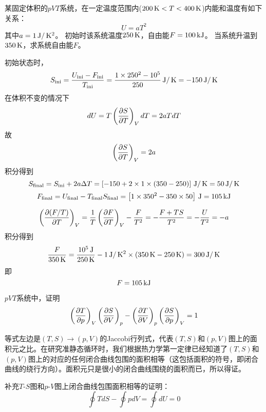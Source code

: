 \documentclass[CJK]{beamer}
\begin{document}
\begin{frame}
  \chtitle{\proid (\sthree)}
  \bch
某固定体积的$pVT$系统，在一定温度范围内($200\,\mathrm{K} < T< 400 \,\mathrm{K}$)内能和温度有如下关系：
  $$U =  aT^2 $$
  其中$a=1 \,\mathrm{J}/\,\mathrm{K}^2$。
  初始时该系统温度$250\,\mathrm{K}$，自由能$F = 100 \,\mathrm{kJ}$。
  当系统升温到$350\,\mathrm{K}$，求系统自由能$F$。
  \ech
\end{frame}

\begin{frame}
  \bch
  初始状态时，
  $$ S_{\rm ini} = \frac{U_{\rm ini}-F_{\rm ini}}{T_{\rm ini}} = \frac{1\times 250^2 - 10^5}{250} \,\mathrm{J}/\,\mathrm{K} = -150\,\mathrm{J}/\,\mathrm{K}$$
  在体积不变的情况下
  $$ dU = T\left(\frac{\partial S}{\partial T}\right)_{V} dT  =  2aTdT$$
  故
  $$ \left(\frac{\partial S}{\partial T}\right)_{V} = 2a $$
  积分得到
  $$ S_{\rm final}  = S_{\rm ini} + 2a\Delta T =  \left[-150 + 2\times 1\times (350-250) \right] \,\mathrm{J}/\,\mathrm{K} = 50 \,\mathrm{J}/\,\mathrm{K} $$
  $$ F_{\rm final} = U_{\rm final}-T_{\rm final}S_{\rm final} = \left[1\times 350^2 - 350\times 50\right] \,\mathrm{J} = 105\,\mathrm{kJ}$$
  
  \ech
\end{frame}

\begin{frame}
  \bch
  $$\left(\frac{\partial (F/T)}{\partial T}\right)_{V} = \frac{1}{T}\left(\frac{\partial F}{\partial T}\right)_{V} - \frac{F}{T^2} = -\frac{F+TS}{T^2} = -\frac{U}{T^2} = -a $$
  积分得到
  $$\frac{F}{350\,\mathrm{K}} = \frac{10^5\,\mathrm{J}}{250\,\mathrm{K}} - 1\,\mathrm{J}/\,\mathrm{K}^2\times(350\,\mathrm{K} - 250\,\mathrm{K}) = 300 \,\mathrm{J}/\,\mathrm{K}$$
  即
  $$F = 105 \,\mathrm{kJ}$$

  \ech
\end{frame}


\begin{frame}
  \chtitle{\proid (\stwo)}
  \bch
  $pVT$系统中，证明
  $$ \left(\frac{\partial T}{\partial p}\right)_{V} \left(\frac{\partial S}{\partial V}\right)_{p} - \left(\frac{\partial T}{\partial V}\right)_{p} \left(\frac{\partial S}{\partial p}\right)_{V} = 1 $$
  \ech
\end{frame}

\begin{frame}
  \bch
  等式左边是$(T,S)\rightarrow (p, V)$的Jaccobi行列式，代表$(T,S)$和$(p,V)$图上的面积元之比。在研究准静态循环时，我们根据热力学第一定律已经知道了$(T,S)$和$(p,V)$图上的对应的任何闭合曲线包围的面积相等（这包括面积的符号，即闭合曲线的绕行方向）。面积元只是很小的闭合曲线围绕的面积而已，所以得证。

  \skipline

  补充$T$-$S$图和$p$-$V$图上闭合曲线包围面积相等的证明：
$$ \oint TdS - \oint pdV = \oint dU = 0$$
  
  \ech
\end{frame}
\end{document}
